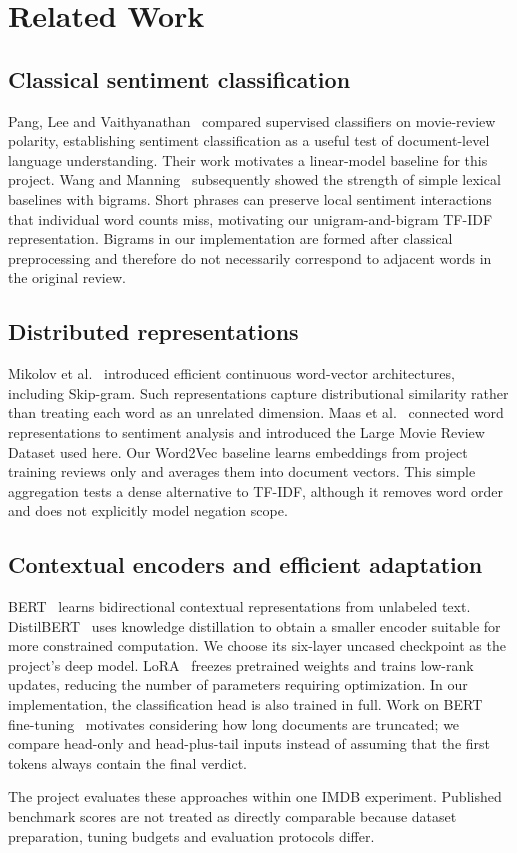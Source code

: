 \section{Related Work}\label{sec:related}
\subsection{Classical sentiment classification}
Pang, Lee and Vaithyanathan~\cite{pang2002} compared supervised classifiers on
movie-review polarity, establishing sentiment classification as a useful test
of document-level language understanding. Their work motivates a linear-model
baseline for this project. Wang and Manning~\cite{wang2012} subsequently showed
the strength of simple lexical baselines with bigrams. Short phrases can preserve
local sentiment interactions that individual word counts miss, motivating our
unigram-and-bigram TF-IDF representation. Bigrams in our implementation are formed
after classical preprocessing and therefore do not necessarily correspond to
adjacent words in the original review.

\subsection{Distributed representations}
Mikolov et al.~\cite{mikolov2013} introduced efficient continuous word-vector
architectures, including Skip-gram. Such representations capture distributional
similarity rather than treating each word as an unrelated dimension. Maas et
al.~\cite{maas2011} connected word representations to sentiment analysis and
introduced the Large Movie Review Dataset used here. Our Word2Vec baseline learns
embeddings from project training reviews only and averages them into document
vectors. This simple aggregation tests a dense alternative to TF-IDF, although
it removes word order and does not explicitly model negation scope.

\subsection{Contextual encoders and efficient adaptation}
BERT~\cite{devlin2019} learns bidirectional contextual representations from
unlabeled text. DistilBERT~\cite{sanh2019} uses knowledge distillation to obtain a
smaller encoder suitable for more constrained computation. We choose its
six-layer uncased checkpoint as the project's deep model. LoRA~\cite{hu2022}
freezes pretrained weights and trains low-rank updates, reducing the number of
parameters requiring optimization. In our implementation, the classification
head is also trained in full. Work on BERT fine-tuning~\cite{sun2019} motivates
considering how long documents are truncated; we compare head-only and head-plus-tail
inputs instead of assuming that the first tokens always contain the final verdict.

The project evaluates these approaches within one IMDB experiment. Published
benchmark scores are not treated as directly comparable because dataset
preparation, tuning budgets and evaluation protocols differ.
